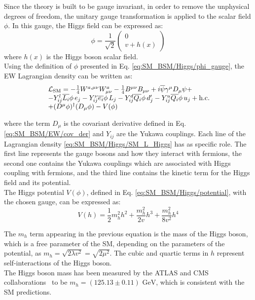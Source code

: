 \noindent Since the theory is built to be gauge invariant, in order to remove the unphysical degrees of freedom, the unitary gauge transformation is applied to the scalar field $\phi$. In this gauge, the Higgs field can be expressed as:
\begin{equation}\label{eq:SM_BSM/Higgs/phi_gauge}
    \phi = \frac{1}{\sqrt{2}} \begin{pmatrix} 0 \\ v + h(x) \end{pmatrix}
\end{equation}
\noindent where $h(x)$ is the Higgs boson scalar field.\\
Using the definition of $\phi$ presented in Eq. \ref{eq:SM_BSM/Higgs/phi_gauge}, the EW Lagrangian density can be written as:
\begin{equation}\label{eq:SM_BSM/Higgs/SM_L_Higgs}
\begin{array}{l@{\;}r}
\mathcal{L}_{\text{SM}} = -\frac{1}{4} W^{a,\mu\nu} W^{a}_{\mu\nu} - \frac{1}{4} B^{\mu\nu} B_{\mu\nu} + i\overline{\psi}\gamma^{\mu} D_{\mu}\psi + \\
- Y^{l}_{ij}\overline{L_i}\phi \, e_j - Y^{\nu}_{ij}\overline{e_i}\phi \, L_j - Y^{d}_{ij}\overline{Q_i}\phi \, d'_j - Y^{u}_{ij}\overline{Q_i}\phi \, u_j + \text{h.c.} \\
+ (D^{\mu}\phi)^{\dagger}(D_{\mu}\phi) - V(\phi)
\end{array}
\end{equation}

\noindent where the term $D_\mu$ is the covariant derivative defined in Eq. \ref{eq:SM_BSM/EW/cov_der} and $Y_{ij}$ are the Yukawa couplings. 
Each line of the Lagrangian density \ref{eq:SM_BSM/Higgs/SM_L_Higgs} has as specific role. The first line represents the gauge bosons and how they interact with fermions, the second one contains the Yukawa couplings which are associated with Higgs coupling with fermions, and the third line contains the kinetic term for the Higgs field and its potential.\\
The Higgs potential $V(\phi)$, defined in Eq. \ref{eq:SM_BSM/Higgs/potential}, with the chosen gauge, can be expressed as:
\begin{equation}\label{eq:SM_BSM/Higgs/potential_gauge}
    V(h) = \frac{1}{2}m_h^2h^2 + \frac{m_h^2}{2v}h^3 + \frac{m_h^2}{8v^2}h^4
\end{equation}

\noindent The $m_h$ term appearing in the previous equation is the mass of the Higgs boson, which is a free parameter of the SM, depending on the parameters of the potential, as $m_h =\sqrt{2\lambda v^2} =\sqrt{2\mu^2}$. The cubic and quartic terms in $h$ represent self-interactions of the Higgs boson.\\
The Higgs boson mass has been measured by the ATLAS and CMS collaborations~\cite{HiggsDiscoveryATLAS,HiggsDiscoveryCMS} to be $m_h = (125.13 \pm 0.11) \text{ GeV}$, which is consistent with the SM predictions.\\


